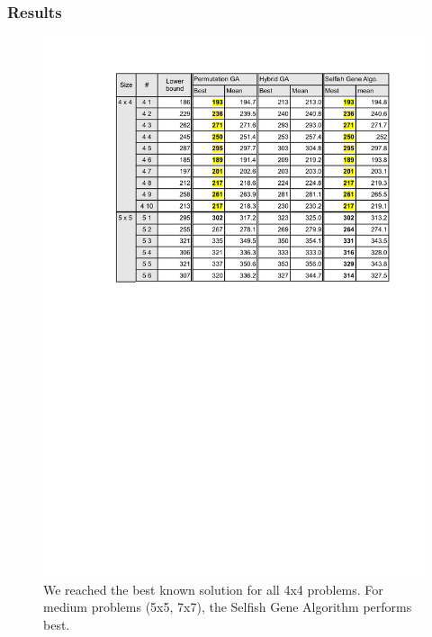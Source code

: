 
\begin{frame}
  \frametitle{Results}
	\vspace{-1.8cm}
\begin{figure}[htbp]
	\centering
	\hspace{1cm}
		\includegraphics[scale=.5]{images/results1.pdf}
	\caption{We reached the best known solution for all 4x4 problems. For medium problems (5x5, 7x7), the Selfish Gene Algorithm performs best.}
	\label{fig:label}
\end{figure}
\end{frame}

